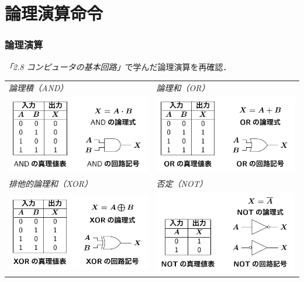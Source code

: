 \documentclass[handout]{beamer}        %
\begin{document}
\section{論理演算命令}
\begin{frame}
  \frametitle{論理演算}
  \emph{「2.8 コンピュータの基本回路」}で学んだ論理演算を再確認．
  \vfill
  \begin{tabular}{l l}
    \emph{論理積（AND）} & \emph{論理和（OR）}      \\
    \includegraphics[scale=0.7]{../Tikz/and.pdf}    &
    \includegraphics[scale=0.7]{../Tikz/or.pdf}     \\
    \emph{排他的論理和（XOR）} & \emph{否定（NOT）} \\
    \includegraphics[scale=0.7]{../Tikz/xor.pdf}    &
    \includegraphics[scale=0.7]{../Tikz/not.pdf}    \\

\end{tabular}
\end{frame}
\end{document}
